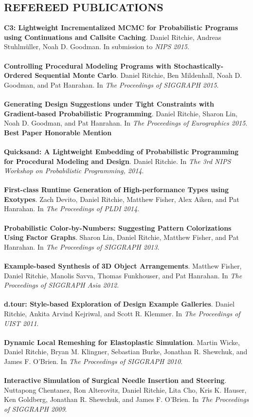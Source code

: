 \documentclass[line,margin]{res}
\begin{document}
\begin{resume}
\section{REFEREED PUBLICATIONS}
\textbf{C3: Lightweight Incrementalized MCMC for Probabilistic Programs using Continuations and Callsite Caching}. 
Daniel Ritchie, Andreas Stuhlm\"uller, Noah D. Goodman. 
In submission to \emph{NIPS 2015}.
\\ \\
\textbf{Controlling Procedural Modeling Programs with Stochastically-Ordered Sequential Monte Carlo}. 
Daniel Ritchie, Ben Mildenhall, Noah D. Goodman, and Pat Hanrahan. 
In \emph{The Proceedings of SIGGRAPH 2015}.
\\ \\
\textbf{Generating Design Suggestions under Tight Constraints with Gradient-based Probabilistic Programming}. 
Daniel Ritchie, Sharon Lin, Noah D. Goodman, and Pat Hanrahan. 
In \emph{The Proceedings of Eurographics 2015}. \textbf{Best Paper Honorable Mention}
\\ \\
\textbf{Quicksand: A Lightweight Embedding of Probabilistic Programming for Procedural Modeling and Design}. 
Daniel Ritchie. 
In \emph{The 3rd NIPS Workshop on Probabilistic Programming, 2014}.
\\ \\
\textbf{First-class Runtime Generation of High-performance Types using Exotypes}. 
Zach Devito, Daniel Ritchie, Matthew Fisher, Alex Aiken, and Pat Hanrahan. 
In \emph{The Proceedings of PLDI 2014}.
\\ \\
\textbf{Probabilistic Color-by-Numbers: Suggesting Pattern Colorizations Using Factor Graphs}. 
Sharon Lin, Daniel Ritchie, Matthew Fisher, and Pat Hanrahan. 
In \emph{The Proceedings of SIGGRAPH 2013}.
\\ \\
\textbf{Example-based Synthesis of 3D Object Arrangements}. 
Matthew Fisher, Daniel Ritchie, Manolis Savva, Thomas Funkhouser, and Pat Hanrahan. 
In \emph{The Proceedings of SIGGRAPH Asia 2012}.
\\ \\
\textbf{d.tour: Style-based Exploration of Design Example Galleries}. 
Daniel Ritchie, Ankita Arvind Kejriwal, and Scott R. Klemmer. 
In \emph{The Proceedings of UIST 2011}.
\\ \\
\textbf{Dynamic Local Remeshing for Elastoplastic Simulation}. 
Martin Wicke, Daniel Ritchie, Bryan M. Klingner, Sebastian Burke, Jonathan R. Shewchuk, and James F. O'Brien. 
In \emph{The Proceedings of SIGGRAPH 2010}.
\\ \\
\textbf{Interactive Simulation of Surgical Needle Insertion and Steering}. 
Nuttapong Chentanez, Ron Alterovitz, Daniel Ritchie, Lita Cho, Kris K. Hauser, Ken Goldberg, Jonathan R. Shewchuk, and James F. O'Brien. 
In \emph{The Proceedings of SIGGRAPH 2009}. 
 


\end{resume}
\end{document}
